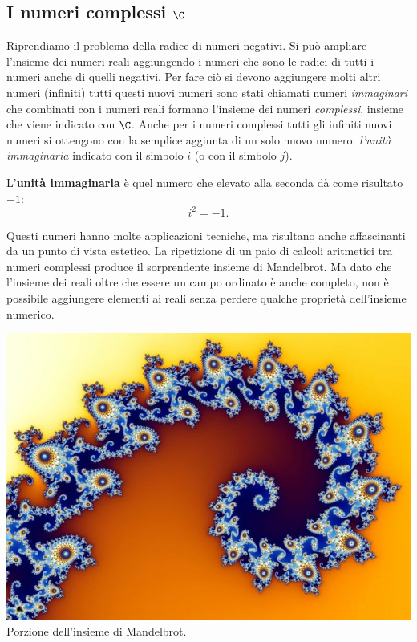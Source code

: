 \subsection{I numeri complessi \(\C\)} \label{subsec:insnum_complessi}

Riprendiamo il problema della radice di numeri negativi. Si può ampliare 
l'insieme dei numeri reali aggiungendo i numeri che sono le radici di tutti i 
numeri anche di quelli negativi. Per fare ciò si devono aggiungere molti altri 
numeri (infiniti) tutti questi nuovi numeri sono stati chiamati numeri 
\emph{immaginari} che combinati con i numeri reali formano l'insieme dei numeri 
\emph{complessi}, insieme che viene indicato con \(\C\). Anche per i numeri 
complessi tutti gli infiniti nuovi numeri si ottengono con la semplice aggiunta 
di un solo nuovo numero: \emph{l'unità immaginaria} indicato con il simbolo 
\(i\) (o con il simbolo \(j\)). \begin{definizione} L'\textbf{unità immaginaria} è 
quel numero che elevato alla seconda dà come risultato \(-1\): \[i^2 = -1.\] 
\end{definizione}

{\noindent
\begin{minipage}{.28\textwidth}
Questi numeri hanno molte applicazioni tecniche, ma risultano anche 
affascinanti da un punto di vista estetico. 
La ripetizione di un paio di calcoli aritmetici tra numeri complessi produce il 
sorprendente insieme di Mandelbrot\footnotemark.
Ma dato che l'insieme dei reali oltre che essere un campo ordinato è anche 
completo, non è possibile aggiungere elementi ai reali senza perdere qualche 
proprietà dell'insieme numerico. 
\end{minipage}
\hfill
\begin{minipage}{.70\textwidth}
\begin{inaccessibleblock} 
\begin{center}
\includegraphics[scale=0.35]{img/fractal.jpg} \\
{\footnotesize Porzione dell'insieme di Mandelbrot.} 
\end{center}
\label{fig:mandelbrot} 
\end{inaccessibleblock} 
\end{minipage}
}

